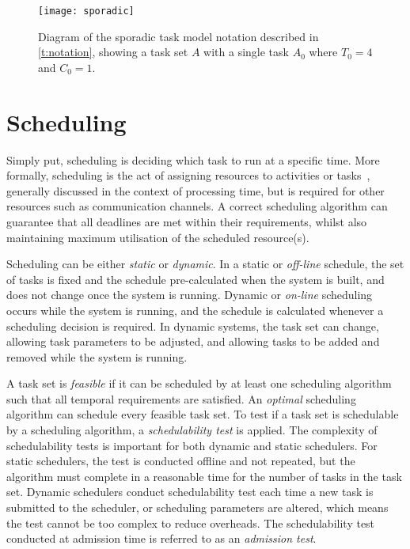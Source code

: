 \begin{figure}[t]
	\begin{center}
		\leavevmode
		\texttt{[image: sporadic]}
        \caption{Diagram of the sporadic task model notation described in \cref{t:notation}, showing
        a task set $A$ with a single task $A_{0}$ where $T_{0} = 4$ and $C_{0} = 1$.}
		\label{fig:fp-schedule}
	\end{center}
\end{figure}


\section{Scheduling}
\label{sec:rt-scheduling}

Simply put, scheduling is deciding which task to run at a specific time. More formally, scheduling
is the act of assigning resources to activities or tasks~\citep{Baruah_CPV_96}, generally discussed
in the context of processing time, but is required for other resources such as communication
channels.  A correct scheduling algorithm  can guarantee that all deadlines are met within their
requirements, whilst also maintaining maximum utilisation of the scheduled resource(s).

Scheduling can be either \emph{static} or \emph{dynamic}. In a static or \emph{off-line} schedule, 
the set of tasks is fixed and the schedule pre-calculated when the system is built, and does not
change once the system is running. 
Dynamic or \emph{on-line} scheduling occurs while the system is running, and the schedule is
calculated whenever a scheduling decision is required. In dynamic systems, the task set can change,
allowing task parameters to be adjusted, and allowing tasks to be added and removed while the system
is running.

A task set is \emph{feasible} if it can be scheduled by at least one scheduling algorithm such that
all temporal requirements are satisfied.
An \emph{optimal} scheduling algorithm can schedule every feasible task set.
To test if a task set is schedulable by a scheduling algorithm, a \emph{schedulability test} is applied.
The complexity of schedulability tests is important for both dynamic and static schedulers. For
static schedulers, the test is conducted offline and not repeated, but the algorithm must complete
in a reasonable time for the number of tasks in the task set. Dynamic schedulers conduct
schedulability test each time a new task is submitted to the scheduler, or scheduling parameters are
altered, which means the test cannot be too complex to reduce overheads. The schedulability test conducted at admission time is
referred to as an \emph{admission test}.

